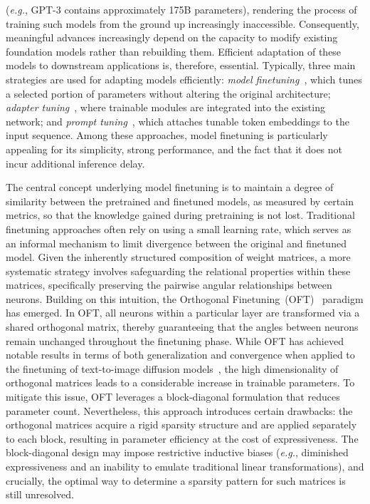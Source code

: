 (\emph{e.g.}, GPT-3 contains approximately 175B parameters), rendering the process of training such models from the ground up increasingly inaccessible. Consequently, meaningful advances increasingly depend on the capacity to modify existing foundation models rather than rebuilding them. Efficient adaptation of these models to downstream applications is, therefore, essential. Typically, three main strategies are used for adapting models efficiently: \emph{model finetuning}~\cite{hulora2022,zaken2022bitfit,guo2020parameter,raffel2020exploring,qiu2023controlling,zhang2022adaptive,chavan2023one}, which tunes a selected portion of parameters without altering the original architecture; \emph{adapter tuning}~\cite{rebuffi2017learning,houlsby2019parameter,pfeiffer2020adapterfusion,lin2020exploring,he2021towards}, where trainable modules are integrated into the existing network; and \emph{prompt tuning}~\cite{li2021prefix,lester2021power}, which attaches tunable token embeddings to the input sequence. Among these approaches, model finetuning is particularly appealing for its simplicity, strong performance, and the fact that it does not incur additional inference delay.

The central concept underlying model finetuning is to maintain a degree of similarity between the pretrained and finetuned models, as measured by certain metrics, so that the knowledge gained during pretraining is not lost. Traditional finetuning approaches often rely on using a small learning rate, which serves as an informal mechanism to limit divergence between the original and finetuned model. Given the inherently structured composition of weight matrices, a more systematic strategy involves safeguarding the relational properties within these matrices, specifically preserving the pairwise angular relationships between neurons. Building on this intuition, the Orthogonal Finetuning~(OFT)~\cite{qiu2023controlling} paradigm has emerged. In OFT, all neurons within a particular layer are transformed via a shared orthogonal matrix, thereby guaranteeing that the angles between neurons remain unchanged throughout the finetuning phase. While OFT has achieved notable results in terms of both generalization and convergence when applied to the finetuning of text-to-image diffusion models~\cite{qiu2023controlling}, the high dimensionality of orthogonal matrices leads to a considerable increase in trainable parameters. To mitigate this issue, OFT leverages a block-diagonal formulation that reduces parameter count. Nevertheless, this approach introduces certain drawbacks: the orthogonal matrices acquire a rigid sparsity structure and are applied separately to each block, resulting in parameter efficiency at the cost of expressiveness. The block-diagonal design may impose restrictive inductive biases (\emph{e.g.}, diminished expressiveness and an inability to emulate traditional linear transformations), and crucially, the optimal way to determine a sparsity pattern for such matrices is still unresolved.

